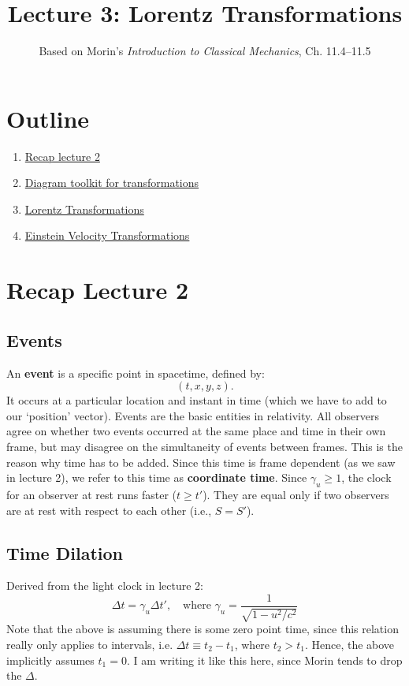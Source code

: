 \documentclass[12pt]{article}
\title{\textbf{Lecture 3: Lorentz Transformations}}
\author{Based on Morin's \textit{Introduction to Classical Mechanics}, Ch. 11.4--11.5}
\date{}
\begin{document}
\maketitle

\section*{Outline}
\begin{enumerate}
    \item \href{sec:recap}{Recap lecture 2}
    \item \href{sec:diagramtoolkit}{Diagram toolkit for transformations}
    \item \href{sec:LT}{Lorentz Transformations}
    \item \href{sec:EVT}{Einstein Velocity Transformations}
\end{enumerate}

\section{Recap Lecture 2}\label{sec:recap}
\subsection{Events}
An \textbf{event} is a specific point in spacetime, defined by:
\[
(t, x, y, z).
\]
It occurs at a particular location and instant in time (which we have to add to our `position' vector). Events are the basic entities in relativity. All observers agree on whether two events occurred at the same place and time in their own frame, but may disagree on the simultaneity of events between frames. This is the reason why time has to be added. Since this time is frame dependent (as we saw in lecture 2), we refer to this time as {\bf coordinate time}. Since $\gamma_u \geq 1$, the clock for an observer at rest runs faster ($t \geq t'$). They are equal only if two observers are at rest with respect to each other (i.e., $S = S'$).

\subsection{Time Dilation}
Derived from the light clock in lecture 2:
\begin{equation}
\Delta t= \gamma_u\Delta t', \quad \text{where } \gamma_u = \frac{1}{\sqrt{1 - u^2/c^2}}
\end{equation}
Note that the above is assuming there is some zero point time, since this relation really only applies to intervals, i.e. $\Delta t \equiv t_2 - t_1$, where $t_2 > t_1$. Hence, the above implicitly assumes $t_1 =0$.  I am writing it like this here, since Morin tends to drop the $\Delta$.
\end{document}
